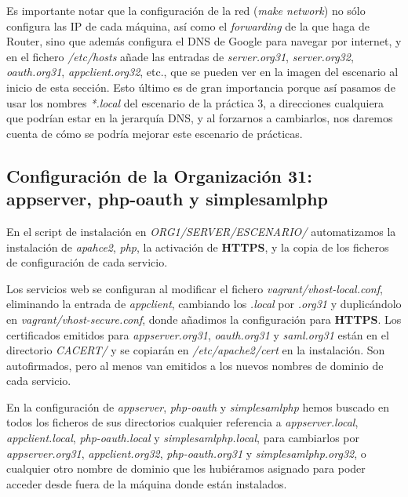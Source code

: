\documentclass[]{article}
\begin{document}
\hfill

Es importante notar que la configuración de la red (\textit{make network}) no sólo configura las IP de cada máquina, así como el \textit{forwarding} de la que haga de Router, sino que además configura el DNS de Google para navegar por internet, y en el fichero \textit{/etc/hosts} añade las entradas de \textit{server.org31}, \textit{server.org32}, \textit{oauth.org31}, \textit{appclient.org32}, etc., que se pueden ver en la imagen del escenario al inicio de esta sección. Esto último es de gran importancia porque así pasamos de usar los nombres \textit{*.local} del escenario de la práctica 3, a direcciones cualquiera que podrían estar en la jerarquía DNS, y al forzarnos a cambiarlos, nos daremos cuenta de cómo se podría mejorar este escenario de prácticas.


\subsection{Configuración de la Organización 31: appserver, php-oauth y simplesamlphp}



En el script de instalación en  \textit{ORG1/SERVER/ESCENARIO/} automatizamos la instalación de \textit{apahce2}, \textit{php}, la activación de \textbf{HTTPS}, y la copia de los ficheros de configuración de cada servicio.

\hfill

Los servicios web se configuran al modificar el fichero \textit{vagrant/vhost-local.conf}, eliminando la entrada de \textit{appclient}, cambiando los \textit{.local} por \textit{.org31} y duplicándolo en \textit{vagrant/vhost-secure.conf}, donde añadimos la configuración para \textbf{HTTPS}. Los certificados emitidos para \textit{appserver.org31}, \textit{oauth.org31} y \textit{saml.org31} están en el directorio \textit{CACERT/} y se copiarán en \textit{/etc/apache2/cert} en la instalación. Son autofirmados, pero al menos van emitidos a los nuevos nombres de dominio de cada servicio.

\hfill

En la configuración de \textit{appserver}, \textit{php-oauth} y \textit{simplesamlphp} hemos buscado en todos los ficheros de sus directorios cualquier referencia a \textit{appserver.local}, \textit{appclient.local}, \textit{php-oauth.local} y \textit{simplesamlphp.local}, para cambiarlos por \textit{appserver.org31}, \textit{appclient.org32}, \textit{php-oauth.org31} y \textit{simplesamlphp.org32}, o cualquier otro nombre de dominio que les hubiéramos asignado para poder acceder desde fuera de la máquina donde están instalados.
\end{document}
